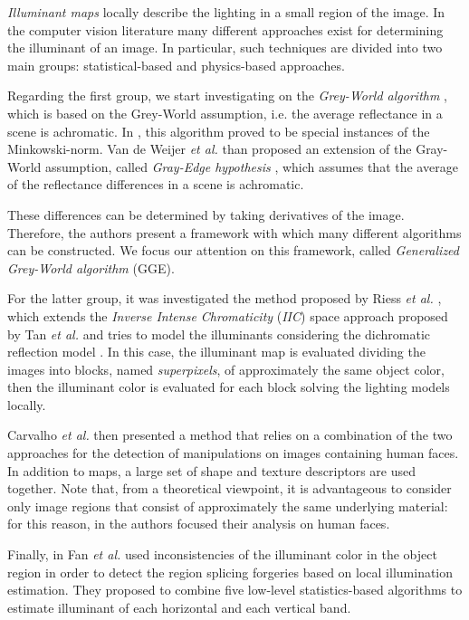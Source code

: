 \emph{Illuminant maps} locally describe the lighting in a small region of the image. In the computer vision literature many different approaches exist for determining the illuminant of an image. In particular, such techniques are divided into two main groups: statistical-based and physics-based approaches.

Regarding the first group, we start investigating on the \emph{Grey-World algorithm} \cite{Buchsbaum19801}, which is based on the Grey-World assumption, i.e. the average reflectance in a scene is achromatic. In \cite{finlayson2004shades}, this algorithm proved to be special instances of the Minkowski-norm. Van de Weijer \emph{et al.} \cite{van2007edge} than proposed an extension of the Gray-World assumption, called \emph{Gray-Edge hypothesis} \cite{van2007edge}, which assumes that the average of the reflectance differences in a scene is achromatic. 

These differences can be determined by taking derivatives of the image. Therefore, the authors present a framework with which many different algorithms can be constructed.
We focus our attention on this framework, called \emph{Generalized Grey-World algorithm} (GGE).

For the latter group, it was investigated the method proposed by Riess \emph{et al.} \cite{riess2010scene}, which extends the \emph{Inverse Intense Chromaticity} (\emph{IIC}) space approach proposed by Tan \emph{et al.} \cite{tan2004color} and tries to model the illuminants considering the dichromatic reflection model \cite{tominaga1989standard}. In this case, the illuminant map is evaluated dividing the images into blocks, named \emph{superpixels}, of approximately the same object color, then the illuminant color is evaluated for each block solving the lighting models locally. 

Carvalho \emph{et al.} \cite{carvalho2016illuminant} then presented a method that relies on a combination of the two approaches for the detection of manipulations on images containing human faces. In addition to maps, a large set of shape and texture descriptors are used together. Note that, from a theoretical viewpoint, it is advantageous to consider only image regions that consist of approximately the same underlying material: for this reason, in \cite{carvalho2016illuminant} the authors focused their analysis on human faces.

Finally, in \cite{fan2015image} Fan \emph{et al.} used inconsistencies of the illuminant color in the object region in order to detect the region splicing forgeries based on local illumination estimation. They proposed to combine five low-level statistics-based algorithms to estimate illuminant of each horizontal and each vertical band.

